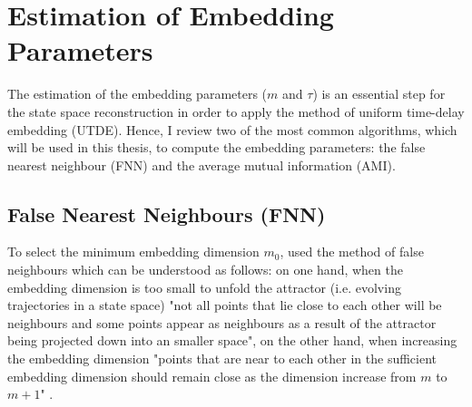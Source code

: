\section{Estimation of Embedding Parameters}
The estimation of the embedding parameters ($m$ and $\tau$) is an essential 
step for the state space reconstruction in order to apply the method of
uniform time-delay embedding (UTDE). 
Hence, I review two of the most common 
algorithms, which will be used in this thesis, to compute the embedding
parameters: the false nearest neighbour (FNN) and the average mutual 
information (AMI).

\subsection{False Nearest Neighbours (FNN)} \label{ch3:fnn}
To select the minimum embedding dimension $m_0$, \cite{kennel1992}
used the method of false neighbours which can be understood as follows:
on one hand, when the embedding dimension is too small to unfold the attractor
(i.e. evolving trajectories in a state space) 
"not all points that lie close to each other will be neighbours and some points
appear as neighbours as a result of the attractor being projected down into an
smaller space", on the other hand, when increasing the embedding dimension 
"points that are near to each other in the sufficient embedding dimension 
should remain close as the dimension increase from $m$ to $m+1$"
\citep[p. 3]{krakovska2015}.

